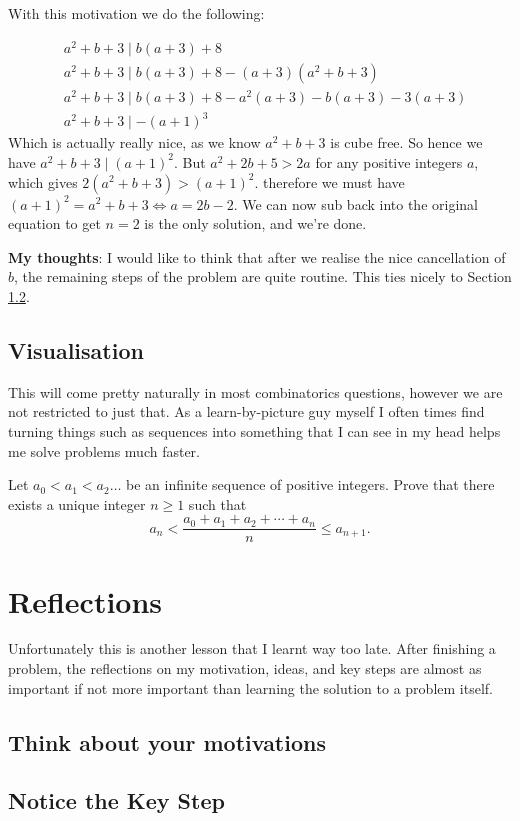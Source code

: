 \documentclass{article}
\theoremstyle{mytheoremstyle}
\theoremstyle{mytheoremstyle}
\theoremstyle{myproblemstyle}
\theoremstyle{myproblemstyle}
\begin{document}
    \begin{center}
    \end{center}

    With this motivation we do the following:

    \begin{align*}
        &a^2 + b + 3 \mid b(a+3) + 8 \\
        &a^2 + b + 3 \mid b(a+3) + 8 - (a+3)(a^2 + b + 3)\\
        &a^2 + b + 3 \mid b(a+3) + 8 - a^2(a+3) - b(a+3) - 3(a+3)\\
        &a^2 + b + 3 \mid -(a+1)^3
    \end{align*}
    Which is actually really nice, as we know $a^2 + b + 3$ is cube free. So hence we have $a^2 + b + 3 \mid (a+1)^2$. But $a^2 + 2b + 5 > 2a$ for any positive integers $a$, which gives $2(a^2 + b + 3) > (a+1)^2$. therefore we must have $(a+1)^2 = a^2 + b + 3 \iff a = 2b - 2$. We can now sub back into the original equation to get $n=2$ is the only solution, and we're done.

    \textbf{My thoughts}: I would like to think that after we realise the nice cancellation of $b$, the remaining steps of the problem are quite routine. This ties nicely to Section \ref{keystep}.

    \subsection{Visualisation}
    This will come pretty naturally in most combinatorics questions, however we are not restricted to just that. As a learn-by-picture guy myself I often times find turning things such as sequences into something that I can see in my head helps me solve problems much faster.

    \begin{example} [ISL 2014 A1]
        Let $a_0 < a_1 < a_2 \ldots$ be an infinite sequence of positive integers. Prove that there exists a unique integer $n\geq 1$ such that \[ a_n < \frac{a_0+a_1+a_2+\cdots+a_n}{n} \leq a_{n+1}. \]
    \end{example}

    \section{Reflections}
    Unfortunately this is another lesson that I learnt way too late. After finishing a problem, the reflections on my motivation, ideas, and key steps are almost as important if not more important than learning the solution to a problem itself. 


    \subsection{Think about your motivations}

    \subsection{Notice the Key Step} \label{keystep}




    

    
    
\end{document}
